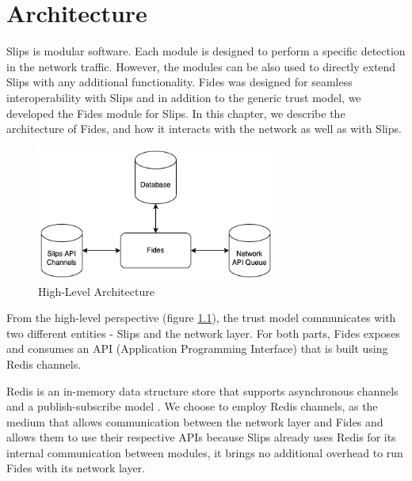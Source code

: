 \chapter{Architecture}
\label{ch:architecture}
Slips is modular software. Each module is designed to perform a specific detection in the network traffic.\cite{slips}
However, the modules can be also used to directly extend Slips with any additional functionality. 
Fides was designed for seamless interoperability with Slips and in addition to the generic trust model, we developed the Fides module for Slips.
In this chapter, we describe the architecture of Fides, and how it interacts with the network as well as with Slips.

\begin{figure}[ht]
    \centering
    \includegraphics[width=0.7\textwidth]{assets/high_architecture.png}
    \caption{High-Level Architecture}
    \label{fig:high-level-architecture}
\end{figure}

From the high-level perspective (figure \ref{fig:high-level-architecture}), the trust model communicates with two different entities - Slips and the network layer.
For both parts, Fides exposes and consumes an API (Application Programming Interface) that is built using Redis channels.

Redis is an in-memory data structure store that supports asynchronous channels and a publish-subscribe model \cite{redis}.
We choose to employ Redis channels, as the medium that allows communication between the network layer and Fides and allows them to use their respective APIs because Slips already uses Redis for its internal communication between modules, it brings no additional overhead to run Fides with its network layer.




